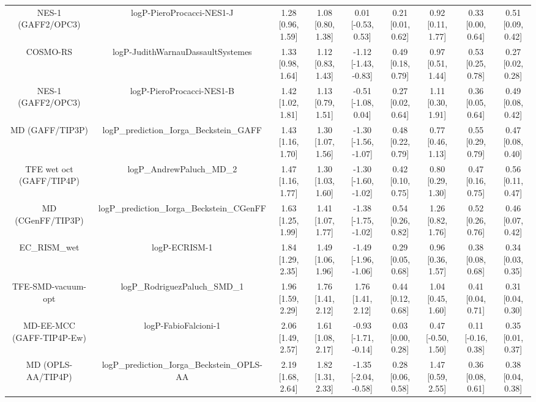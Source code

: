 \documentclass{article}
\begin{document}
\begin{center}
\begin{longtable}{|ccccccccc|}
           NES-1 (GAFF2/OPC3) &                      logP-PieroProcacci-NES1-J &  1.28 [0.96, 1.59] &  1.08 [0.80, 1.38] &    0.01 [-0.53, 0.53] &  0.21 [0.01, 0.62] &     0.92 [0.11, 1.77] &     0.33 [0.00, 0.64] &     0.51 [0.09, 0.42] \\
                     COSMO-RS &              logP-JudithWarnauDassaultSystemes &  1.33 [0.98, 1.64] &  1.12 [0.83, 1.43] &  -1.12 [-1.43, -0.83] &  0.49 [0.18, 0.79] &     0.97 [0.51, 1.44] &     0.53 [0.25, 0.78] &     0.27 [0.02, 0.28] \\
           NES-1 (GAFF2/OPC3) &                      logP-PieroProcacci-NES1-B &  1.42 [1.02, 1.81] &  1.13 [0.79, 1.51] &   -0.51 [-1.08, 0.04] &  0.27 [0.02, 0.64] &     1.11 [0.30, 1.91] &     0.36 [0.05, 0.64] &     0.49 [0.08, 0.42] \\
              MD (GAFF/TIP3P) &       logP\_prediction\_Iorga\_Beckstein\_GAFF &  1.43 [1.16, 1.70] &  1.30 [1.07, 1.56] &  -1.30 [-1.56, -1.07] &  0.48 [0.22, 0.79] &     0.77 [0.46, 1.13] &     0.55 [0.29, 0.79] &     0.47 [0.08, 0.40] \\
     TFE wet oct (GAFF/TIP4P) &                      logP\_AndrewPaluch\_MD\_2 &  1.47 [1.16, 1.77] &  1.30 [1.03, 1.60] &  -1.30 [-1.60, -1.02] &  0.42 [0.10, 0.75] &     0.80 [0.29, 1.30] &     0.47 [0.16, 0.75] &     0.56 [0.11, 0.47] \\
            MD (CGenFF/TIP3P) &     logP\_prediction\_Iorga\_Beckstein\_CGenFF &  1.63 [1.25, 1.99] &  1.41 [1.07, 1.77] &  -1.38 [-1.75, -1.02] &  0.54 [0.26, 0.82] &     1.26 [0.82, 1.76] &     0.52 [0.26, 0.76] &     0.46 [0.07, 0.42] \\
                  EC_RISM_wet &                                  logP-ECRISM-1 &  1.84 [1.29, 2.35] &  1.49 [1.06, 1.96] &  -1.49 [-1.96, -1.06] &  0.29 [0.05, 0.68] &     0.96 [0.36, 1.57] &     0.38 [0.08, 0.68] &     0.34 [0.03, 0.35] \\
           TFE-SMD-vacuum-opt &                  logP\_RodriguezPaluch\_SMD\_1 &  1.96 [1.59, 2.29] &  1.76 [1.41, 2.12] &     1.76 [1.41, 2.12] &  0.44 [0.12, 0.68] &     1.04 [0.45, 1.60] &     0.41 [0.04, 0.71] &     0.31 [0.04, 0.30] \\
    MD-EE-MCC (GAFF-TIP4P-Ew) &                           logP-FabioFalcioni-1 &  2.06 [1.49, 2.57] &  1.61 [1.08, 2.17] &  -0.93 [-1.71, -0.14] &  0.03 [0.00, 0.28] &    0.47 [-0.50, 1.50] &    0.11 [-0.16, 0.38] &     0.35 [0.01, 0.37] \\
           MD (OPLS-AA/TIP4P) &    logP\_prediction\_Iorga\_Beckstein\_OPLS-AA &  2.19 [1.68, 2.64] &  1.82 [1.31, 2.33] &  -1.35 [-2.04, -0.58] &  0.28 [0.06, 0.58] &     1.47 [0.59, 2.55] &     0.36 [0.08, 0.61] &     0.38 [0.04, 0.38] \\

\end{longtable}
\end{center}
\end{document}
